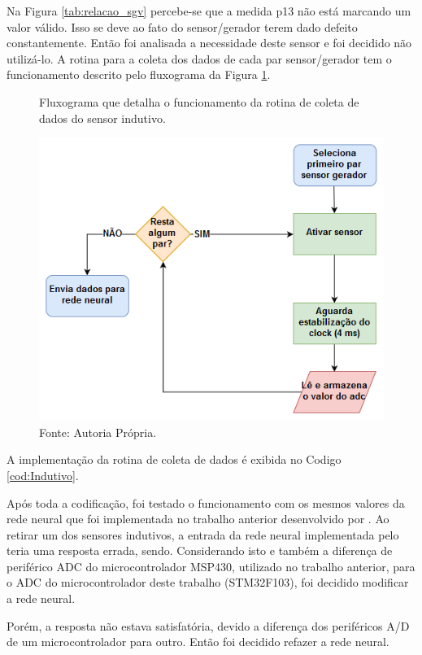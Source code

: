 Na Figura \ref{tab:relacao_sgv} percebe-se que a medida p13 não está marcando um valor válido. Isso se deve ao fato do sensor/gerador terem dado defeito constantemente. Então foi analisada a necessidade deste sensor e foi decidido não utilizá-lo.
A rotina para a coleta dos dados de cada par sensor/gerador tem o funcionamento descrito pelo fluxograma da Figura \ref{fig:fluxograma_rotina_coleta}.
\begin{figure}[H]
	\vspace{4mm}
	\centering
	\caption{Fluxograma que detalha o funcionamento da rotina de coleta de dados do sensor indutivo.}
	\label{fig:fluxograma_rotina_coleta}
	\includegraphics[scale=0.6]{imagens/rotinaColetaIndutivo}
	\caption*{Fonte: Autoria Própria.}
\end{figure}

A implementação da rotina de coleta de dados é exibida no Codigo \ref{cod:Indutivo}.

Após toda a codificação, foi testado o funcionamento com os mesmos valores da rede neural que foi implementada no trabalho anterior desenvolvido por . Ao retirar um dos sensores indutivos, a entrada da rede neural implementada pelo  teria uma resposta errada, sendo. Considerando isto e também a diferença de periférico ADC do microcontrolador MSP430, utilizado no trabalho anterior, para o ADC do microcontrolador deste trabalho (STM32F103), foi decidido modificar a rede neural.

Porém, a resposta não estava satisfatória, devido a diferença dos periféricos A/D de um microcontrolador para outro. Então foi decidido refazer a rede neural.

